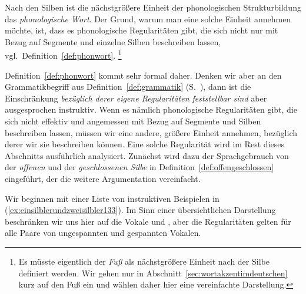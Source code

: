 
Nach den Silben ist die nächstgrößere Einheit der phonologischen Strukturbildung das \textit{phonologische Wort}.
Der Grund, warum man eine solche Einheit annehmen möchte, ist, dass es phonologische Regularitäten gibt, die sich nicht nur mit Bezug auf Segmente und einzelne Silben beschreiben lassen, vgl.\ Definition~\ref{def:phonwort}.%
\footnote{Es müsste eigentlich der \textit{Fuß} als nächstgrößere Einheit nach der Silbe definiert werden.
Wir gehen nur in Abschnitt~\ref{sec:wortakzentimdeutschen} kurz auf den Fuß ein und wählen daher hier eine vereinfachte Darstellung.}


Definition~\ref{def:phonwort} kommt sehr formal daher.
Denken wir aber an den Grammatikbegriff aus Definition~\ref{def:grammatik} (S.~\pageref{def:grammatik}), dann ist die Einschränkung \textit{bezüglich derer eigene Regularitäten feststellbar sind} aber ausgesprochen instruktiv.
Wenn es nämlich phonologische Regularitäten gibt, die sich nicht effektiv und angemessen mit Bezug auf Segmente und Silben beschreiben lassen, müssen wir eine andere, größere Einheit annehmen, bezüglich derer wir sie beschreiben können.
Eine solche Regularität wird im Rest dieses Abschnitts ausführlich analysiert.
Zunächst wird dazu der Sprachgebrauch von der \textit{offenen} und der \textit{geschlossenen Silbe} in Definition~\ref{def:offengeschlossen} eingeführt, der die weitere Argumentation vereinfacht.


Wir beginnen mit einer Liste von instruktiven Beispielen in (\ref{ex:einsilblerundzweisilbler133}). 
Im Sinn einer übersichtlichen Darstellung beschränken wir uns hier auf die Vokale \textipa{[I]} und \textipa{[i]}, aber die Regularitäten gelten für alle Paare von ungespannten und gespannten Vokalen.

